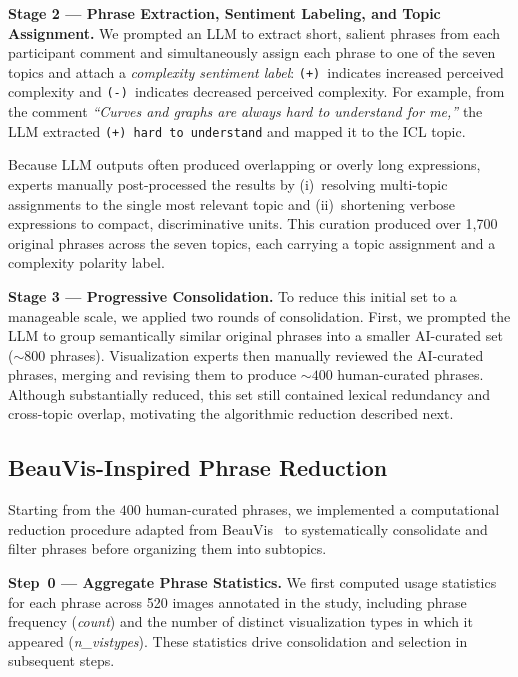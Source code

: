 \documentclass[journal]{IEEEtran}
\begin{document}
\noindent\textbf{Stage 2 — Phrase Extraction, Sentiment Labeling, and Topic Assignment.}
We prompted an LLM to extract short, salient phrases from each participant comment and simultaneously assign each phrase to one of the seven topics and attach a \emph{complexity sentiment label}: \texttt{(+)}~indicates increased perceived complexity and \texttt{(-)}~indicates decreased perceived complexity.
For example, from the comment \textit{``Curves and graphs are always hard to understand for me,''} the LLM extracted \texttt{(+) hard to understand} and mapped it to the ICL topic.

Because LLM outputs often produced overlapping or overly long expressions, experts manually post-processed the results by (i)~resolving multi-topic assignments to the single most relevant topic and (ii)~shortening verbose expressions to compact, discriminative units.
This curation produced over 1,700 original phrases across the seven topics, each carrying a topic assignment and a complexity polarity label.

\noindent\textbf{Stage 3 — Progressive Consolidation.}
To reduce this initial set to a manageable scale, we applied two rounds of consolidation.
First, we prompted the LLM to group semantically similar original phrases into a smaller AI-curated set (${\sim}800$ phrases).
Visualization experts then manually reviewed the AI-curated phrases, merging and revising them to produce ${\sim}400$ human-curated phrases.
Although substantially reduced, this set still contained lexical redundancy and cross-topic overlap, motivating the algorithmic reduction described next.

\subsection{BeauVis-Inspired Phrase Reduction}
\label{sec:reduction}

Starting from the $400$ human-curated phrases, we implemented a computational reduction procedure adapted from BeauVis~\cite{he2022beauvis} to systematically consolidate and filter phrases before organizing them into subtopics.

\noindent\textbf{Step~0 — Aggregate Phrase Statistics.}
We first computed usage statistics for each phrase across 520 images annotated in the study, including phrase frequency (\textit{count}) and the number of distinct visualization types in which it appeared (\textit{n\_vistypes}).
These statistics drive consolidation and selection in subsequent steps.
\end{document}
